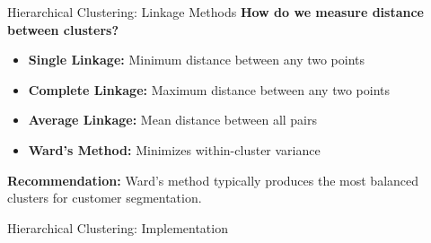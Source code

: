 \documentclass[aspectratio=169,ignorenonframetext]{beamer}
\begin{document}
\begin{frame}{Hierarchical Clustering: Linkage Methods}
\textbf{How do we measure distance between clusters?}

\begin{itemize}
\item
  \textbf{Single Linkage:} Minimum distance between any two points
\item
  \textbf{Complete Linkage:} Maximum distance between any two points
\item
  \textbf{Average Linkage:} Mean distance between all pairs
\item
  \textbf{Ward's Method:} Minimizes within-cluster variance
\end{itemize}

\textbf{Recommendation:} Ward's method typically produces the most
balanced clusters for customer segmentation.
\end{frame}

\begin{frame}[fragile]{Hierarchical Clustering: Implementation}
\begin{Shaded}
\begin{Highlighting}[]

\OperatorTok{=}\NormalTok{ [}\NormalTok{, }\NormalTok{,}
                   \NormalTok{, }\NormalTok{]}
\OperatorTok{=}\NormalTok{ \{\}}

\OperatorTok{=}
\OperatorTok{=}
\NormalTok{    )}
\end{Highlighting}
\end{Shaded}
\end{frame}
\end{document}
